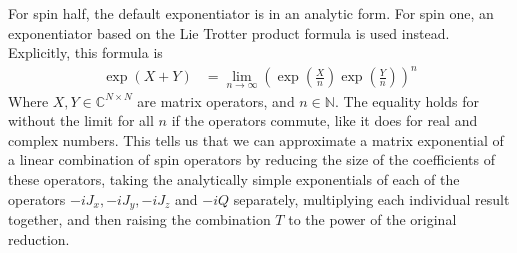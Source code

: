 \documentclass{jors}
\begin{document}
		For spin half, the default exponentiator is in an analytic form.
		For spin one, an exponentiator based on the Lie Trotter product formula\cite{moler_nineteen_2003} is used instead.
		Explicitly, this formula is
		\begin{align}
			\exp\left( X + Y\right) &= \lim_{n\to\infty} \left(\exp\left(\frac{X}{n}\right) \exp\left(\frac{Y}{n}\right)\right)^n
		\end{align}
		Where \(X,Y\in\mathbb{C}^{N\times N}\) are matrix operators, and \(n\in\mathbb{N}\).
		The equality holds for without the limit for all \(n\) if the operators commute, like it does for real and complex numbers.
		This tells us that we can approximate a matrix exponential of a linear combination of spin operators by reducing the size of the coefficients of these operators, taking the analytically simple exponentials of each of the operators \(-iJ_x, -iJ_y, -iJ_z\) and \(-iQ\) separately, multiplying each individual result together, and then raising the combination \(T\) to the power of the original reduction.
		
\end{document}
